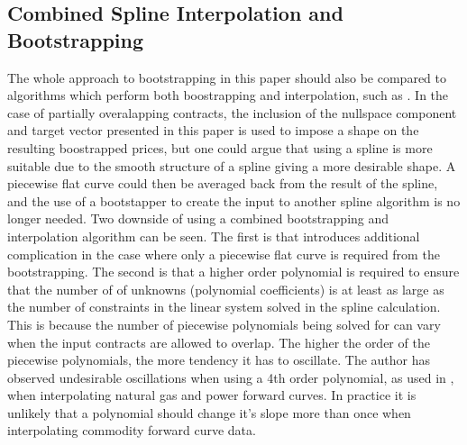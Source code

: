 \documentclass{article}
\begin{document}
\subsection{Combined Spline Interpolation and Bootstrapping}
The whole approach to bootstrapping in this paper should also be compared to algorithms
which perform both boostrapping and interpolation, such as \cite{Benth}. In the case of
partially overalapping contracts, the inclusion of the nullspace component and target
vector presented in this paper is used to impose a shape on the resulting boostrapped
prices, but one could argue that using a spline is more suitable due to the smooth 
structure of a spline giving a more desirable shape. A piecewise flat curve could
then be averaged back from the result of the spline, and the use of a bootstapper
to create the input to another spline algorithm is no longer needed. Two downside of
using a combined bootstrapping and interpolation algorithm can be seen. The first
is that introduces additional complication in the case where only a piecewise flat
curve is required from the bootstrapping. The second is that a higher order polynomial
is required to ensure that the number of of unknowns (polynomial coefficients) is at
least as large as the number of constraints in the linear system solved in the spline
calculation. This is because the number of piecewise polynomials being solved for can 
vary when the input contracts are allowed to overlap. The higher the order of the
piecewise polynomials, the more tendency it has to oscillate.
The author has observed undesirable oscillations when using a 4th order polynomial,
as used in \cite{Benth}, when interpolating natural gas and power forward curves. 
In practice it is unlikely that a polynomial should change it's
slope more than once when interpolating commodity forward curve data.


\bigskip
\end{document}
